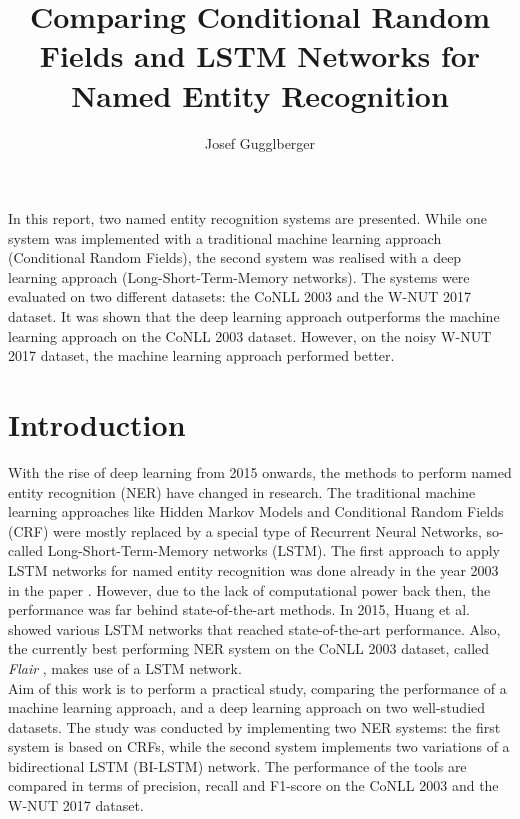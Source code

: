 \documentclass[12pt]{book}
\begin{document}
    \title{Comparing Conditional Random Fields and LSTM Networks for Named Entity Recognition}
    \author{Josef Gugglberger}
    \beforepreface
    
    In this report, two named entity recognition systems are presented. While one system was implemented with a traditional machine learning approach (Conditional Random Fields), the second system was realised with a deep learning approach (Long-Short-Term-Memory networks). The systems were evaluated on two different datasets: the CoNLL 2003 and the W-NUT 2017 dataset. It was shown that the deep learning approach outperforms the machine learning approach on the CoNLL 2003 dataset. However, on the noisy W-NUT 2017 dataset, the machine learning approach performed better.

 	\afterpreface
 	
 	
    \chapter{Introduction}
    
    With the rise of deep learning from 2015 onwards, the methods to perform named entity recognition (NER) have changed in research. The traditional machine learning approaches like Hidden Markov Models and Conditional Random Fields (CRF) were mostly replaced by a special type of Recurrent Neural Networks, so-called Long-Short-Term-Memory networks (LSTM). The first approach to apply LSTM networks for named entity recognition was done already in the year 2003 in the paper \cite{hammerton-2003-named}. However, due to the lack of computational power back then, the performance was far behind state-of-the-art methods. In 2015, Huang et al. \cite{huang2015bidirectional} showed various LSTM networks that reached state-of-the-art performance. Also, the currently best performing NER system on the CoNLL 2003 \cite{sang2003introduction} dataset, called \textit{Flair} \cite{akbik2018contextual}, makes use of a LSTM network. \\
    
    Aim of this work is to perform a practical study, comparing the performance of a machine learning approach, and a deep learning approach on two well-studied datasets. The study was conducted by implementing two NER systems: the first system is based on CRFs, while the second system implements two variations of a bidirectional LSTM (BI-LSTM) network. The performance of the tools are compared in terms of precision, recall and F1-score on the CoNLL 2003 and the W-NUT 2017 \cite{derczynski2017results} dataset. \\
    
\end{document}
